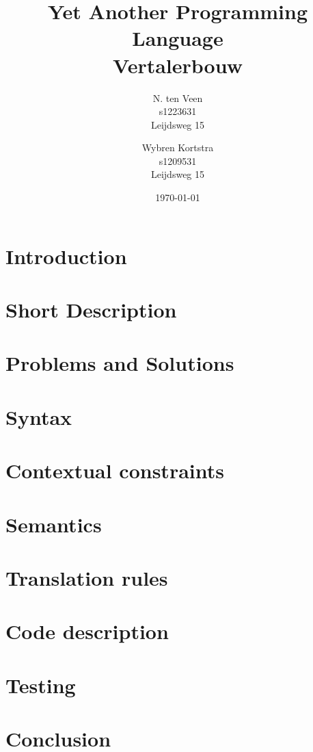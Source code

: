 \documentclass[a4paper]{report}
\title{
	Yet Another Programming Language \\
	{\large Vertalerbouw }
}
\author{
	N. ten Veen \\
    s1223631 \\
    Leijdsweg 15
	\and
    Wybren Kortstra \\
    s1209531 \\
    Leijdsweg 15
}
\date{\today}
\begin{document}
\maketitle

\tableofcontents \pagebreak

\chapter{Introduction}



\chapter{Short Description}


\chapter{Problems and Solutions}


\chapter{Syntax}



\chapter{Contextual constraints}


\chapter{Semantics}

\chapter{Translation rules}

\chapter{Code description}

\chapter{Testing}

\chapter{Conclusion}
\end{document}
